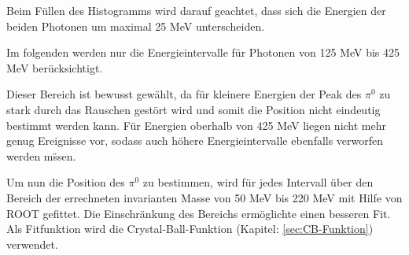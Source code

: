\documentclass[a4paper,11pt,oneside,final,german,openbib,pdftex]{scrbook}
\begin{document}
{Beim Füllen des Histogramms wird darauf geachtet, dass sich die Energien der beiden Photonen um maximal 25 MeV unterscheiden.

Im folgenden werden nur die Energieintervalle f\"ur Photonen von 125 MeV bis 425 MeV ber\"ucksichtigt.

Dieser Bereich ist bewusst gew\"ahlt, da f\"ur kleinere Energien der Peak des $\pi^0$ zu stark durch das Rauschen gest\"ort wird und somit die Position nicht eindeutig bestimmt werden kann. F\"ur Energien oberhalb von 425 MeV liegen nicht mehr genug Ereignisse vor, sodass auch h\"ohere Energieintervalle ebenfalls verworfen werden m\"ssen. 


Um nun die Position des $\pi^0$ zu bestimmen, wird für jedes Intervall über den Bereich der errechneten invarianten Masse von 50 MeV bis 220 MeV mit Hilfe von ROOT gefittet. Die Einschr\"ankung des Bereichs erm\"oglichte einen besseren Fit. Als Fitfunktion wird die Crystal-Ball-Funktion (Kapitel: \ref{sec:CB-Funktion}) verwendet. 

  
 
%		
 
}
\end{document}
